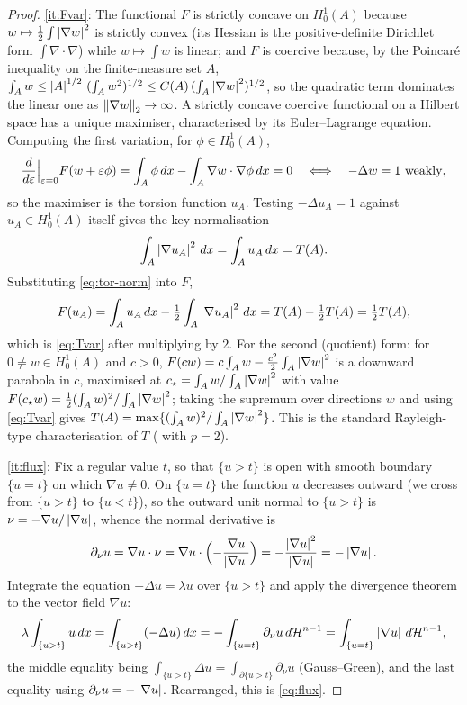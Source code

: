 \begin{proof}
\ref{it:Fvar}: The functional $F$ is strictly concave on $H^1_0(A)$ because
$w\mapsto\tfrac12\int\left|\nabla w\right|^2$ is strictly convex (its Hessian is the
positive-definite Dirichlet form $\int\nabla\cdot\nabla$) while
$w\mapsto\int w$ is linear; and $F$ is coercive because, by the Poincar\'e
inequality on the finite-measure set $A$,
$\int_A w\le\left|A\right|^{1/2}\,(\int_A w^2)^{1/2}
\le C(A)\,(\int_A\left|\nabla w\right|^2)^{1/2}$, so the quadratic term dominates
the linear one as $\left\|\nabla w\right\|_2\to\infty$. A strictly concave coercive
functional on a Hilbert space has a unique maximiser, characterised by its
Euler--Lagrange equation. Computing the first variation, for $\phi\in
H^1_0(A)$,
\[
  \frac{d}{d\varepsilon}\Big|_{\varepsilon=0}F(w+\varepsilon\phi)
  =\int_A\phi\,dx-\int_A\nabla w\cdot\nabla\phi\,dx=0
  \quad\Longleftrightarrow\quad -\Delta w=1\ \text{weakly},
\]
so the maximiser is the torsion function $u_A$. Testing $-\Delta u_A=1$
against $u_A\in H^1_0(A)$ itself gives the key normalisation
\begin{equation}\label{eq:tor-norm}
  \int_A\left|\nabla u_A\right|^2\,dx=\int_A u_A\,dx=T(A).
\end{equation}
Substituting \eqref{eq:tor-norm} into $F$,
\[
  F(u_A)=\int_A u_A\,dx-\tfrac12\int_A\left|\nabla u_A\right|^2\,dx
  =T(A)-\tfrac12 T(A)=\tfrac12 T(A),
\]
which is \eqref{eq:Tvar} after multiplying by $2$. For the second
(quotient) form: for $0\ne w\in H^1_0(A)$ and $c>0$, $F(cw)=c\int_A w
-\tfrac{c^2}{2}\int_A\left|\nabla w\right|^2$ is a downward parabola in $c$,
maximised at $c_\star=\int_A w/\int_A\left|\nabla w\right|^2$ with value
$F(c_\star w)=\tfrac12(\int_A w)^2/\int_A\left|\nabla w\right|^2$; taking the
supremum over directions $w$ and using \eqref{eq:Tvar} gives
$T(A)=\max\{(\int_A w)^2/\int_A\left|\nabla w\right|^2\}$. This is the standard
Rayleigh-type characterisation of $T$ (\cite[Prop.~2.2]{Brasco2014} with
$p=2$).

\ref{it:flux}: Fix a regular value $t$, so that $\{u>t\}$ is open with
smooth boundary $\{u=t\}$ on which $\nabla u\ne0$. On $\{u=t\}$ the function
$u$ decreases outward (we cross from $\{u>t\}$ to $\{u<t\}$), so the outward
unit normal to $\{u>t\}$ is $\nu=-\nabla u/\left|\nabla u\right|$, whence the normal
derivative is
\[
  \partial_\nu u=\nabla u\cdot\nu
  =\nabla u\cdot\Bigl(-\frac{\nabla u}{\left|\nabla u\right|}\Bigr)
  =-\frac{\left|\nabla u\right|^2}{\left|\nabla u\right|}=-\left|\nabla u\right|.
\]
Integrate the equation $-\Delta u=\lambda u$ over $\{u>t\}$ and apply the
divergence theorem to the vector field $\nabla u$:
\[
  \lambda\int_{\{u>t\}}u\,dx
  =\int_{\{u>t\}}(-\Delta u)\,dx
  =-\int_{\{u=t\}}\partial_\nu u\,d\mathcal H^{n-1}
  =\int_{\{u=t\}}\left|\nabla u\right|\,d\mathcal H^{n-1},
\]
the middle equality being $\int_{\{u>t\}}\Delta u=\int_{\partial\{u>t\}}
\partial_\nu u$ (Gauss--Green), and the last equality using
$\partial_\nu u=-\left|\nabla u\right|$. Rearranged, this is \eqref{eq:flux}.
\end{proof}

